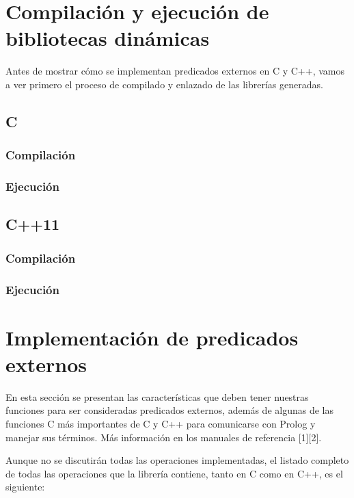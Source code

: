 \documentclass[a4paper,12pt]{article}
\begin{document}
\section{Compilación y ejecución de bibliotecas dinámicas}

Antes de mostrar cómo se implementan predicados externos en C y C++, vamos a ver primero el proceso de compilado y enlazado de las librerías generadas.
\subsection{C}
\subsubsection{Compilación}
\subsubsection{Ejecución}
\subsection{C++11}
\subsubsection{Compilación}
\subsubsection{Ejecución}


\section{Implementación de predicados externos}

En esta sección se presentan las características que deben tener nuestras funciones para ser consideradas predicados externos, además de algunas de las funciones C más importantes de C y C++ para comunicarse con Prolog y manejar sus términos. Más información en los manuales de referencia [1][2].

Aunque no se discutirán todas las operaciones implementadas, el listado completo de todas las operaciones que la librería contiene, tanto en C como en C++, es el siguiente:
\end{document}

